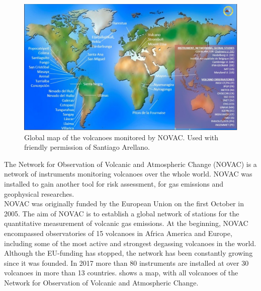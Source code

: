 

		\begin{figure}[h]
			\centering
			\includegraphics[width=0.8\linewidth]{Bilder/NOVAC2015}
			\caption{Global map of the volcanoes monitored by NOVAC. Used with friendly permission of Santiago Arellano.}
			\label{fig:novac2015}
		\end{figure}
		The Network for Observation of Volcanic and Atmospheric Change (NOVAC) is a network of instruments monitoring volcanoes over the whole world. 
		NOVAC was installed to gain another tool for risk assessment, for gas emissions and geophysical researches.\\
		NOVAC was originally funded by the European Union on the first October in 2005. The aim of NOVAC is to  establish  a  global  
		network  of  stations  for  the  quantitative  measurement  of  volcanic gas  emissions. At the beginning, NOVAC encompassed observatories of 15 volcanoes in Africa America and Europe, including some of the most active and strongest degassing volcanoes in the world. Although the EU-funding has stopped, the network has been constantly growing since it was founded. In 2017 more than 80 instruments are installed at over 30 volcanoes in more than 13 countries.
		 shows a map, with all volcanoes of the Network for Observation of Volcanic and Atmospheric Change.\\
		
